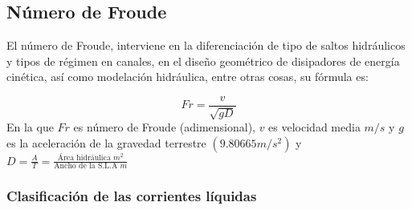 \subsection{Número de Froude}

El número de Froude, interviene en la diferenciación de tipo de saltos hidráulicos y tipos de régimen en canales, en el diseño geométrico de disipadores de energía cinética, así como modelación hidráulica, entre otras cosas, su fórmula es: 

\begin{equation}
    Fr = \frac{v}{\sqrt{gD}}
\end{equation}
En la que $Fr$ es número de Froude (adimensional), $v$ es velocidad media $m/s$ y $g$ es la aceleración de la gravedad terrestre $(9.80665m/s^2)$ y $D=\frac{A}{T}=\frac{\text{Área hidráulica }m^2}{\text{Ancho de la S.L.A }m}$

\subsubsection{Clasificación de las corrientes líquidas}

